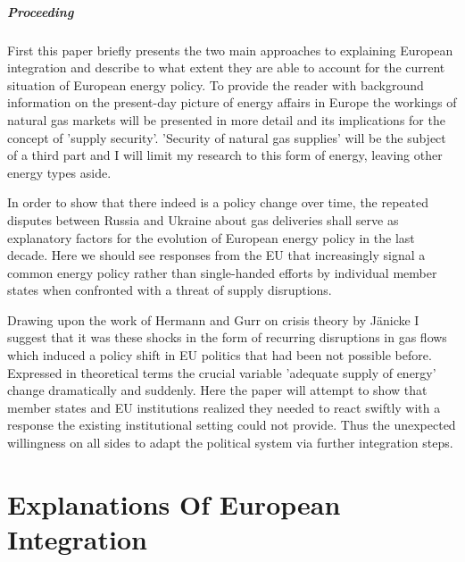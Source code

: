 \documentclass[11pt,a4paper,english]{scrreprt}
\begin{document}
	\paragraph{Proceeding}

First this paper briefly presents the two main approaches to explaining
European integration and describe to what extent they are able to account for
the current situation of European energy policy. To provide the reader with
background information on the present-day picture of energy affairs in Europe
the workings of natural gas markets will be presented in more detail and its
implications for the concept of 'supply security'. 'Security of natural gas
supplies' will be the subject of a third part and I will limit my research
to this form of energy, leaving other energy types aside.\par

In order to show that there indeed is a policy change over time, the repeated
disputes between Russia and Ukraine about gas deliveries shall serve as
explanatory factors for the evolution of European energy policy in the last
decade. Here we should see responses from the EU that increasingly signal a
common energy policy rather than single-handed efforts by individual member
states when confronted with a threat of supply disruptions.\par

Drawing upon the work of Hermann and Gurr on crisis theory by J\"anicke I
suggest that it was these shocks in the form of recurring disruptions in gas
flows which induced a policy shift in EU politics that had been not possible
before. Expressed in theoretical terms the crucial variable 'adequate supply
of energy' change dramatically and suddenly. Here the paper will attempt to
show that member states and EU institutions realized they needed to react
swiftly with a response the existing institutional setting could not
provide. Thus the unexpected willingness on all sides to adapt the political
system via further integration steps.\par


	
	


\chapter{Explanations Of European Integration}	
	
\end{document}
